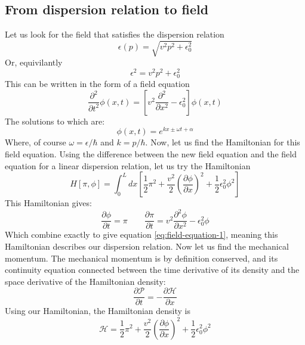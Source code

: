 \documentclass{article}
\begin{document}
\subsection{From dispersion relation to field}
Let us look for the field that satisfies the dispersion relation
\begin{equation}
    \epsilon(p) = \sqrt{v^2p^2 + \epsilon_0^2}
\end{equation}
Or, equivilantly
\begin{equation}
    \epsilon^2 = v^2p^2 + \epsilon_0^2
\end{equation}
This can be written in the form of a field equation
\begin{equation}
\label{eq:field-equation-1}
    \frac{\partial^2}{\partial t^2}\phi(x,t) = \left[v^2\frac{\partial^2}{\partial x^2} - \epsilon_0^2\right]\phi(x,t)
\end{equation}
The solutions to which are:
\begin{equation}
    \phi(x,t) = e^{kx \pm \omega t + \alpha}
\end{equation}
Where, of course $\omega = \epsilon/\hbar$ and $k = p/\hbar$. Now, let us find the Hamiltonian for this field equation. Using the difference between the new field equation and the field equation for a linear dispersion relation, let us try the Hamiltonian
\begin{equation}
    H[\pi, \phi] = \int_0^L dx \left[\frac{1}{2}\pi^2 + \frac{v^2}{2}\left(\frac{\partial \phi}{\partial x}\right)^2 + \frac{1}{2}\epsilon_0^2\phi^2\right]
\end{equation}
This Hamiltonian gives:
\begin{equation}
    \frac{\partial \phi}{\partial t} = \pi
    \qquad
    \frac{\partial \pi}{\partial t} = v^2 \frac{\partial^2 \phi}{\partial x^2} - \epsilon_0^2 \phi
\end{equation}
Which combine exactly to give equation \ref{eq:field-equation-1}, meaning this Hamiltonian describes our dispersion relation. Now let us find the mechanical momentum. The mechanical momentum is by definition conserved, and its continuity equation connected between the time derivative of its density and the space derivative of the Hamiltonian density:
\begin{equation}
    \frac{\partial \mathcal{P}}{\partial t} = -\frac{\partial \mathcal{H}}{\partial x}
\end{equation}
Using our Hamiltonian, the Hamiltonian density is
\begin{equation}
    \mathcal{H} = \frac{1}{2}\pi^2 + \frac{v^2}{2}\left(\frac{\partial \phi}{\partial x}\right)^2 + \frac{1}{2}\epsilon_0^2\phi^2
\end{equation}
\end{document}
